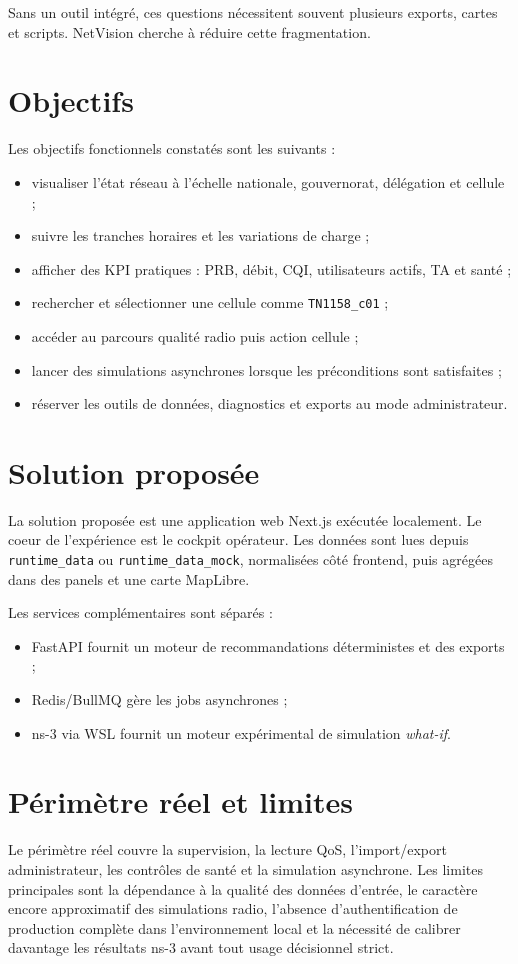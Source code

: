 \documentclass[12pt,a4paper,oneside]{report}
\begin{document}
Sans un outil intégré, ces questions nécessitent souvent plusieurs exports, cartes et scripts. NetVision cherche à réduire cette fragmentation.

\section{Objectifs}
Les objectifs fonctionnels constatés sont les suivants :
\begin{itemize}
    \item visualiser l'état réseau à l'échelle nationale, gouvernorat, délégation et cellule ;
    \item suivre les tranches horaires et les variations de charge ;
    \item afficher des KPI pratiques : PRB, débit, CQI, utilisateurs actifs, TA et santé ;
    \item rechercher et sélectionner une cellule comme \texttt{TN1158\_c01} ;
    \item accéder au parcours qualité radio puis action cellule ;
    \item lancer des simulations asynchrones lorsque les préconditions sont satisfaites ;
    \item réserver les outils de données, diagnostics et exports au mode administrateur.
\end{itemize}

\section{Solution proposée}
La solution proposée est une application web Next.js exécutée localement. Le coeur de l'expérience est le cockpit opérateur. Les données sont lues depuis \texttt{runtime\_data} ou \texttt{runtime\_data\_mock}, normalisées côté frontend, puis agrégées dans des panels et une carte MapLibre.

Les services complémentaires sont séparés :
\begin{itemize}
    \item FastAPI fournit un moteur de recommandations déterministes et des exports ;
    \item Redis/BullMQ gère les jobs asynchrones ;
    \item ns-3 via WSL fournit un moteur expérimental de simulation \emph{what-if}.
\end{itemize}

\section{Périmètre réel et limites}
Le périmètre réel couvre la supervision, la lecture QoS, l'import/export administrateur, les contrôles de santé et la simulation asynchrone. Les limites principales sont la dépendance à la qualité des données d'entrée, le caractère encore approximatif des simulations radio, l'absence d'authentification de production complète dans l'environnement local et la nécessité de calibrer davantage les résultats ns-3 avant tout usage décisionnel strict.
\end{document}
